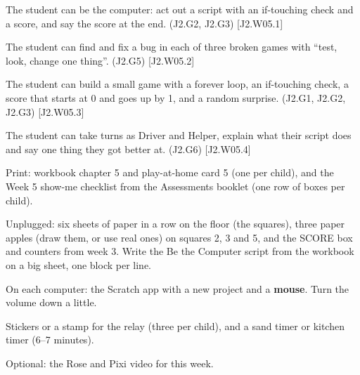 
\begin{objectives}
  \item The student can be the computer: act out a script with an if-touching check and a score, and say the score at the end. (J2.G2, J2.G3) [J2.W05.1]
  \item The student can find and fix a bug in each of three broken games with \enquote{test, look, change one thing}. (J2.G5) [J2.W05.2]
  \item The student can build a small game with a forever loop, an if-touching check, a score that starts at 0 and goes up by 1, and a random surprise. (J2.G1, J2.G2, J2.G3) [J2.W05.3]
  \item The student can take turns as Driver and Helper, explain what their script does and say one thing they got better at. (J2.G6) [J2.W05.4]
\end{objectives}

\begin{materials}
  \item Print: workbook chapter 5 and play-at-home card 5 (one per child), and the Week 5 show-me checklist from the Assessments booklet (one row of boxes per child).
  \item Unplugged: six sheets of paper in a row on the floor (the squares), three paper apples (draw them, or use real ones) on squares 2, 3 and 5, and the SCORE box and counters from week 3. Write the Be the Computer script from the workbook on a big sheet, one block per line.
  \item On each computer: the Scratch app with a new project and a \textbf{mouse}. Turn the volume down a little.
  \item Stickers or a stamp for the relay (three per child), and a sand timer or kitchen timer (6--7 minutes).
  \item Optional: the Rose and Pixi video for this week.
\end{materials}

